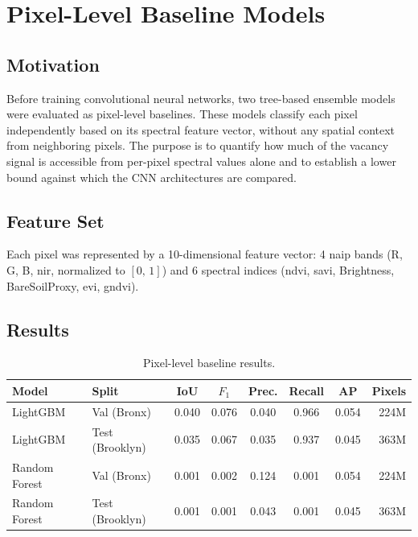 \chapter{Pixel-Level Baseline Models}
\label{appendix:tree_baselines}

\section{Motivation}

Before training convolutional neural networks, two tree-based ensemble models were evaluated as pixel-level baselines. These models classify each pixel independently based on its spectral feature vector, without any spatial context from neighboring pixels. The purpose is to quantify how much of the vacancy signal is accessible from per-pixel spectral values alone and to establish a lower bound against which the CNN architectures are compared.

\section{Feature Set}

Each pixel was represented by a 10-dimensional feature vector: 4 \acrshort{naip} bands (R, G, B, \acrshort{nir}, normalized to $[0,\,1]$) and 6 spectral indices (\acrshort{ndvi}, \acrshort{savi}, Brightness, BareSoilProxy, \acrshort{evi}, \acrshort{gndvi}).

\section{Results}

\begin{table}[htbp]
  \centering
  \caption{Pixel-level baseline results.}
  \label{tab:pixel_baselines}
  \begin{tabular}{llcccccr}
    \toprule
    \textbf{Model} & \textbf{Split} & \textbf{IoU} & \textbf{$F_1$} & \textbf{Prec.} & \textbf{Recall} & \textbf{AP} & \textbf{Pixels} \\
    \midrule
    LightGBM & Val (Bronx) & 0.040 & 0.076 & 0.040 & 0.966 & 0.054 & 224M \\
    LightGBM & Test (Brooklyn) & 0.035 & 0.067 & 0.035 & 0.937 & 0.045 & 363M \\
    Random Forest & Val (Bronx) & 0.001 & 0.002 & 0.124 & 0.001 & 0.054 & 224M \\
    Random Forest & Test (Brooklyn) & 0.001 & 0.001 & 0.043 & 0.001 & 0.045 & 363M \\
    \bottomrule
  \end{tabular}
\end{table}

